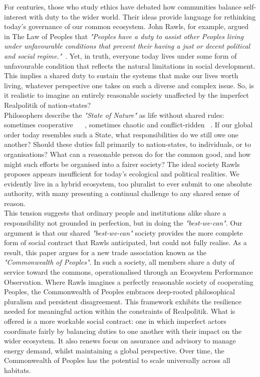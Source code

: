 \documentclass[10pt, oneside]{article}   	%
\begin{document}
For centuries, those who study ethics have debated how communities balance self-interest with duty to the wider world.
Their ideas provide language for rethinking today’s governance of our common ecosystem.
John Rawls, for example, argued in The Law of Peoples that \emph{"Peoples have a duty to assist other Peoples living under unfavourable conditions that prevent their having a just or decent political and social regime."}~\cite{jr2}.
Yet, in truth, everyone today lives under some form of unfavourable condition that reflects the natural limitations in social development.
This implies a shared duty to sustain the systems that make our lives worth living, whatever perspective one takes on such a diverse and complex issue.
So, is it realistic to imagine an entirely reasonable society unaffected by the imperfect Realpolitik of nation-states?\\

Philosophers describe the \emph{"State of Nature"} as life without shared rules: sometimes cooperative ~\cite{jl1} ~\cite{rn1}, sometimes chaotic and conflict-ridden ~\cite{th1}.
If our global order today resembles such a State, what responsibilities do we still owe one another?
Should these duties fall primarily to nation-states, to individuals, or to organisations?
What can a reasonable person do for the common good, and how might such efforts be organised into a fairer society?
The ideal society Rawls proposes appears insufficient for today’s ecological and political realities.
We evidently live in a hybrid ecosystem, too pluralist to ever submit to one absolute authority, with many presenting a continual challenge to any shared sense of reason.\\

This tension suggests that ordinary people and institutions alike share a responsibility not grounded in perfection, but in doing the \emph{"best-we-can"}.
Our argument is that our shared \emph{"best-we-can"} society provides the more complete form of social contract that Rawls anticipated, but could not fully realise.
As a result, this paper argues for a new trade association known as the \emph{"Commonwealth of Peoples"}.
In such a society, all members share a duty of service toward the commons, operationalised through an Ecosystem Performance Observation.
Where Rawls imagines a perfectly reasonable society of cooperating Peoples, the Commonwealth of Peoples embraces deep-rooted philosophical pluralism and persistent disagreement.
This framework exhibits the resilience needed for meaningful action within the constraints of Realpolitik.
What is offered is a more workable social contract: one in which imperfect actors coordinate fairly by balancing duties to one another with their impact on the wider ecosystem.
It also renews focus on assurance and advisory to manage energy demand, whilst maintaining a global perspective.
Over time, the Commonwealth of Peoples has the potential to scale universally across all habitats.\\
\end{document}
